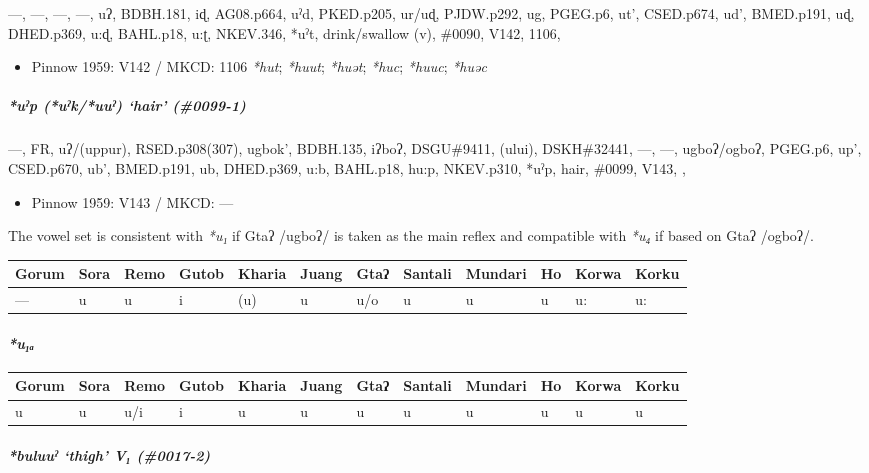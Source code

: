 \documentclass[a4paper,]{article}
\providecommand{\tightlist}{%
  \setlength{\itemsep}{0pt}\setlength{\parskip}{0pt}}
\let\oldparagraph\paragraph
\renewcommand{\paragraph}[1]{\oldparagraph{#1}\mbox{}}
\let\oldsubparagraph\subparagraph
\renewcommand{\subparagraph}[1]{\oldsubparagraph{#1}\mbox{}}
\begin{document}
---, ---, ---, ---, uʔ, BDBH.181, iɖ, AG08.p664, uˀd, PKED.p205, ur/uɖ,
PJDW.p292, ug, PGEG.p6, ut', CSED.p674, ud', BMED.p191, uɖ, DHED.p369,
u:ɖ, BAHL.p18, u:ʈ, NKEV.346, *uˀt, drink/swallow (v), \#0090, V142,
1106,

\begin{itemize}
\tightlist
\item
  Pinnow 1959: V142 / MKCD: 1106 \emph{*hut}; \emph{*huut};
  \emph{*huət}; \emph{*huc}; \emph{*huuc}; \emph{*huəc}
\end{itemize}

\subparagraph{\texorpdfstring{\emph{*uˀp} (\emph{*uˀk/*uuˀ}) `hair'
(\#0099-1)}{*uˀp (*uˀk/*uuˀ) hair (\#0099-1)}}\label{uux2c0p-uux2c0kuuux2c0-hair-0099-1}

---, FR, uʔ/(uppur), RSED.p308(307), ugbok', BDBH.135, iʔboʔ,
DSGU\#9411, (ului), DSKH\#32441, ---, ---, ugboʔ/ogboʔ, PGEG.p6, up',
CSED.p670, ub', BMED.p191, ub, DHED.p369, u:b, BAHL.p18, hu:p,
NKEV.p310, *uˀp, hair, \#0099, V143, ,

\begin{itemize}
\tightlist
\item
  Pinnow 1959: V143 / MKCD: ---
\end{itemize}

The vowel set is consistent with \emph{*u₁} if Gtaʔ /ugboʔ/ is taken as
the main reflex and compatible with \emph{*u₄} if based on Gtaʔ /ogboʔ/.

\begin{longtable}[]{@{}llllllllllll@{}}
\toprule
Gorum & Sora & Remo & Gutob & Kharia & Juang & Gtaʔ & Santali & Mundari
& Ho & Korwa & Korku\tabularnewline
\midrule
\endhead
--- & u & u & i & (u) & u & u/o & u & u & u & u: & u:\tabularnewline
\bottomrule
\end{longtable}

\paragraph{\texorpdfstring{\emph{*u₁ₐ}}{*u₁ₐ}}\label{uux2090}

\begin{longtable}[]{@{}llllllllllll@{}}
\toprule
Gorum & Sora & Remo & Gutob & Kharia & Juang & Gtaʔ & Santali & Mundari
& Ho & Korwa & Korku\tabularnewline
\midrule
\endhead
u & u & u/i & i & u & u & u & u & u & u & u & u\tabularnewline
\bottomrule
\end{longtable}

\subparagraph{\texorpdfstring{\emph{*buluuˀ} `thigh' V₁
(\#0017-2)}{*buluuˀ thigh V₁ (\#0017-2)}}\label{buluuux2c0-thigh-v-0017-2}
\end{document}
